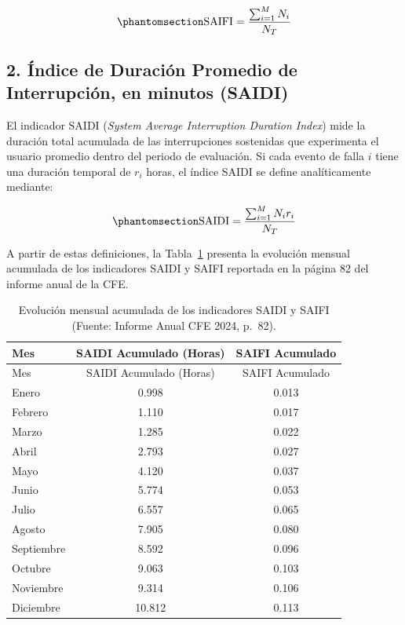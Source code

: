 \documentclass[
  spanish,
  letterpaper,
  DIV=11,
  numbers=noendperiod]{scrreprt}
\theoremstyle{plain}
\theoremstyle{plain}
\theoremstyle{plain}
\theoremstyle{definition}
\theoremstyle{remark}
\begin{document}
\begin{equation}\phantomsection\label{eq-saifi}{
\displaystyle \text{SAIFI} = \frac{\sum_{i=1}^{M} N_i}{N_T}
}\end{equation}

\subsection{2. Índice de Duración Promedio de Interrupción, en minutos
(SAIDI)}\label{uxedndice-de-duraciuxf3n-promedio-de-interrupciuxf3n-en-minutos-saidi}

El indicador SAIDI (\emph{System Average Interruption Duration Index})
mide la duración total acumulada de las interrupciones sostenidas que
experimenta el usuario promedio dentro del periodo de evaluación. Si
cada evento de falla \(i\) tiene una duración temporal de \(r_i\) horas,
el índice SAIDI se define analíticamente mediante:

\begin{equation}\phantomsection\label{eq-saidi}{
\displaystyle \text{SAIDI} = \frac{\sum_{i=1}^{M} N_i r_i}{N_T}
}\end{equation}

A partir de estas definiciones, la Tabla~\ref{tbl-saidi-saifi} presenta
la evolución mensual acumulada de los indicadores SAIDI y SAIFI
reportada en la página 82 del informe anual de la CFE.

\begin{longtable}[]{@{}lcc@{}}
\caption{Evolución mensual acumulada de los indicadores SAIDI y SAIFI
(Fuente: Informe Anual CFE 2024,
p.~82).}\label{tbl-saidi-saifi}\tabularnewline
\toprule\noalign{}
Mes & SAIDI Acumulado (Horas) & SAIFI Acumulado \\
\midrule\noalign{}
\endfirsthead
\toprule\noalign{}
Mes & SAIDI Acumulado (Horas) & SAIFI Acumulado \\
\midrule\noalign{}
\endhead
\bottomrule\noalign{}
\endlastfoot
Enero & 0.998 & 0.013 \\
Febrero & 1.110 & 0.017 \\
Marzo & 1.285 & 0.022 \\
Abril & 2.793 & 0.027 \\
Mayo & 4.120 & 0.037 \\
Junio & 5.774 & 0.053 \\
Julio & 6.557 & 0.065 \\
Agosto & 7.905 & 0.080 \\
Septiembre & 8.592 & 0.096 \\
Octubre & 9.063 & 0.103 \\
Noviembre & 9.314 & 0.106 \\
Diciembre & 10.812 & 0.113 \\
\end{longtable}
\end{document}
